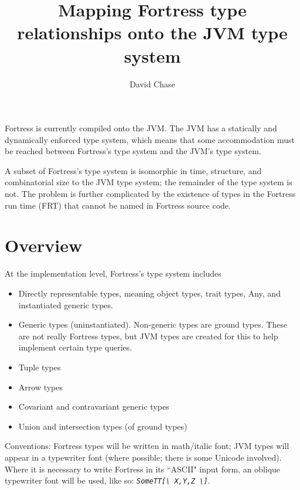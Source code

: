 \documentclass[11pt]{article}
\title{Mapping Fortress type relationships onto the JVM type system}
\author{David Chase}
\newcommand{\ftt}[1]{{\tt\slshape{#1}}}
\def\BS{\textbackslash}
\begin{document}
\maketitle

Fortress is currently compiled onto the JVM.  The JVM has a statically and dynamically enforced type system, which means that some accommodation must be reached between Fortress's type system and the JVM's type system.

A subset of Fortress's type system is isomorphic in time, structure, and combinatorial size to the JVM type system; the remainder of the type system is not.  The problem is further complicated by the existence of types in the Fortress run time (FRT) that cannot be named in Fortress source code. 

\section{Overview}
At the implementation level, Fortress's type system includes
\begin{itemize}
\item Directly representable types, meaning object types, trait types, Any, and instantiated generic types.
\item Generic types (uninstantiated).  Non-generic types are ground types.  These are not really Fortress types, but JVM types are created for this to help implement certain type queries.
\item Tuple types
\item Arrow types
\item Covariant and contravariant generic types
\item Union and intersection types (of ground types)
\end{itemize}

Conventions: Fortress types will be written in math/italic font; JVM types will appear in a typewriter font (where possible; there is some Unicode involved).  Where it is necessary to write Fortress in its ``ASCII" input form, an oblique typewriter font will be used, like so: \ftt{SomeTT[\BS\ X,Y,Z \BS]}.
\end{document}
